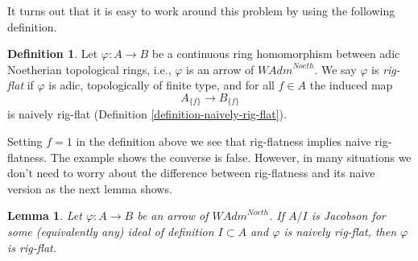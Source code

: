 \documentclass{stacks-project}
\theoremstyle{plain}
\newtheorem{lemma}[subsection]{Lemma}
\theoremstyle{definition}
\newtheorem{definition}[subsection]{Definition}
\theoremstyle{remark}
\numberwithin{equation}{subsection}
\begin{document}
\noindent
It turns out that it is easy to work around this problem by
using the following definition.

\begin{definition}
\label{definition-rig-flat-continuous-homomorphism}
Let $\varphi : A \to B$ be a continuous ring homomorphism between
adic Noetherian topological rings, i.e., $\varphi$ is an arrow of
$\textit{WAdm}^{Noeth}$. We say $\varphi$ is {\it rig-flat} if $\varphi$
is adic, topologically of finite type, and for all $f \in A$ the induced map
$$
A_{\{f\}} \longrightarrow B_{\{f\}}
$$
is naively rig-flat (Definition \ref{definition-naively-rig-flat}).
\end{definition}

\noindent
Setting $f = 1$ in the definition above we see that rig-flatness
implies naive rig-flatness. The example shows the converse is false.
However, in many situations we don't need to worry about the difference
between rig-flatness and its naive version as the next lemma shows.

\begin{lemma}
\label{lemma-rig-flat-naive}
Let $\varphi : A \to B$ be an arrow of $\textit{WAdm}^{Noeth}$.
If $A/I$ is Jacobson for some (equivalently any) ideal of definition
$I \subset A$ and $\varphi$ is naively rig-flat, then $\varphi$ is
rig-flat.
\end{lemma}
\end{document}
